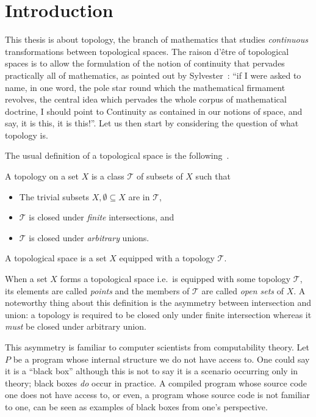 \chapter{Introduction}\label{chap:intro}

This thesis is about topology, the branch of mathematics that studies \emph{continuous}
transformations between topological spaces. The raison d'être of topological spaces is to
allow the formulation of the notion of continuity that pervades practically all of
mathematics, as pointed out by Sylvester~\cite[pg.~27]{armstrong-topology}: ``if I were
asked to name, in one word, the pole star round which the mathematical firmament revolves,
the central idea which pervades the whole corpus of mathematical doctrine, I should point
to Continuity as contained in our notions of space, and say, it is this, it is this!''.
Let us then start by considering the question of what topology is.

The usual definition of a topological space is the following~\cite{munkres}.
\begin{defn}\label{defn:topospace}
  A topology on a set $X$ is a class $\mathcal{T}$ of subsets of $X$ such that
  \begin{itemize}
    \item The trivial subsets $X, \emptyset \subseteq X$ are in $\mathcal{T}$,
    \item $\mathcal{T}$ is closed under \emph{finite} intersections, and
    \item $\mathcal{T}$ is closed under \emph{arbitrary} unions.
  \end{itemize}
  A topological space is a set $X$ equipped with a topology $\mathcal{T}$.
\end{defn}

When a set $X$ forms a topological space i.e.~is equipped with some topology
$\mathcal{T}$, its elements are called \emph{points} and the members of $\mathcal{T}$ are
called \emph{open sets} of $X$. A noteworthy thing about this definition is the asymmetry
between intersection and union: a topology is required to be closed only under finite
intersection whereas it \emph{must} be closed under arbitrary union.

This asymmetry is familiar to computer scientists from computability theory. Let $P$ be a
program whose internal structure we do not have access to. One could say it is a ``black
box'' although this is not to say it is a scenario occurring only in theory; black boxes
\emph{do} occur in practice. A compiled program whose source code one does not have access
to, or even, a program whose source code is not familiar to one, can be seen as examples
of black boxes from one's perspective.

